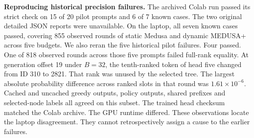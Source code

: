 \textbf{Reproducing historical precision failures.} The archived Colab run passed its strict check on 15 of 20 pilot prompts and 6 of 7 known cases. The two original detailed JSON reports were unavailable. On the laptop, all seven known cases passed, covering 855 observed rounds of static Medusa and dynamic MEDUSA+ across five budgets. We also reran the five historical pilot failures. Four passed. One of 818 observed rounds across those five prompts failed full-rank equality. At generation offset 19 under $B=32$, the tenth-ranked token of head five changed from ID 310 to 2821. That rank was unused by the selected tree. The largest absolute probability difference across ranked slots in that round was $1.61\times10^{-6}$. Cached and uncached greedy outputs, policy outputs, shared prefixes and selected-node labels all agreed on this subset. The trained head checksum matched the Colab archive. The GPU runtime differed. These observations locate the laptop disagreement. They cannot retrospectively assign a cause to the earlier failures.

